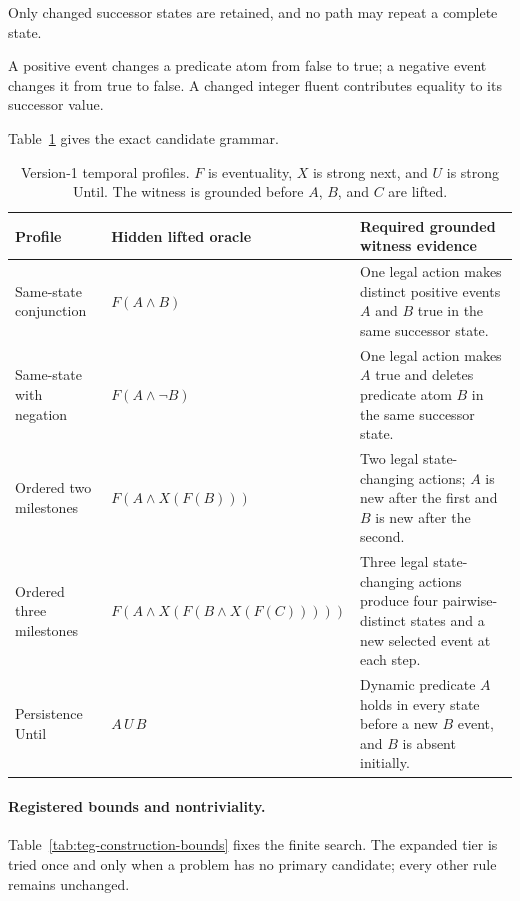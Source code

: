Only changed successor states are retained, and no path may repeat a complete
state.

A positive event changes a predicate atom from false to true; a negative event
changes it from true to false. A changed integer fluent contributes equality to
its successor value.

Table~\ref{tab:teg-construction-profiles} gives the exact candidate grammar.

\begin{table}[htbp]
\centering
\small
\setlength{\tabcolsep}{4pt}
\begin{tabular}{p{}p{}p{}}
\toprule
Profile & Hidden lifted oracle & Required grounded witness evidence \\
\midrule
Same-state conjunction & $F(A\land B)$ &
One legal action makes distinct positive events $A$ and $B$ true in the same
successor state. \\
Same-state with negation & $F(A\land\neg B)$ &
One legal action makes $A$ true and deletes predicate atom $B$ in the same
successor state. \\
Ordered two milestones & $F(A\land X(F(B)))$ &
Two legal state-changing actions; $A$ is new after the first and $B$ is new
after the second. \\
Ordered three milestones & $F(A\land X(F(B\land X(F(C)))))$ &
Three legal state-changing actions produce four pairwise-distinct states and a
new selected event at each step. \\
Persistence Until & $A\,U\,B$ &
Dynamic predicate $A$ holds in every state before a new $B$ event, and $B$ is
absent initially. \\
\bottomrule
\end{tabular}
\caption{Version-1 temporal profiles. $F$ is eventuality, $X$ is strong next,
and $U$ is strong Until. The witness is grounded before $A$, $B$, and $C$ are
lifted.}
\label{tab:teg-construction-profiles}
\end{table}

\paragraph{Registered bounds and nontriviality.}
Table~\ref{tab:teg-construction-bounds} fixes the finite search. The expanded
tier is tried once and only when a problem has no primary candidate; every
other rule remains unchanged.

